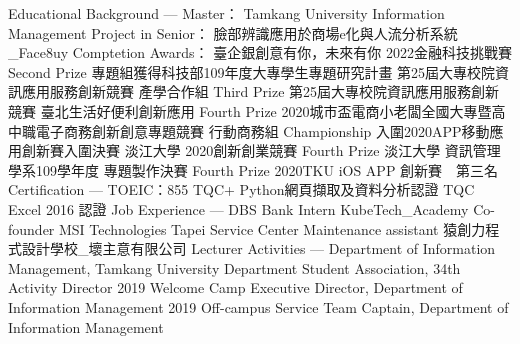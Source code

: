 Educational Background —
Master： Tamkang University Information Management
Project in Senior：
臉部辨識應用於商場e化與人流分析系統_Face8uy
Comptetion Awards：
臺企銀創意有你，未來有你 2022金融科技挑戰賽 Second Prize
專題組獲得科技部109年度大專學生專題研究計畫
第25屆大專校院資訊應用服務創新競賽 產學合作組 Third Prize
第25屆大專校院資訊應用服務創新競賽 臺北生活好便利創新應用 Fourth Prize
2020城市盃電商小老闆全國大專暨高中職電子商務創新創意專題競賽
行動商務組 Championship
入圍2020APP移動應用創新賽入圍決賽
淡江大學 2020創新創業競賽 Fourth Prize
淡江大學 資訊管理學系109學年度 專題製作決賽 Fourth Prize
2020TKU iOS APP 創新賽　第三名
Certification —
TOEIC：855
TQC+ Python網頁擷取及資料分析認證
TQC Excel 2016 認證
Job Experience —
DBS Bank Intern
KubeTech_Academy Co-founder
MSI Technologies Tapei Service Center Maintenance assistant
猿創力程式設計學校_壞主意有限公司 Lecturer
Activities —
Department of Information Management, Tamkang University
Department Student Association, 34th Activity Director
2019 Welcome Camp Executive Director, Department of Information Management
2019 Off-campus Service Team Captain, Department of Information Management